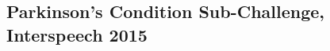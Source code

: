 \documentclass{article}
\begin{document}
\subsection{Parkinson's Condition Sub-Challenge, Interspeech 2015}
%
%
%
%
\end{document}
